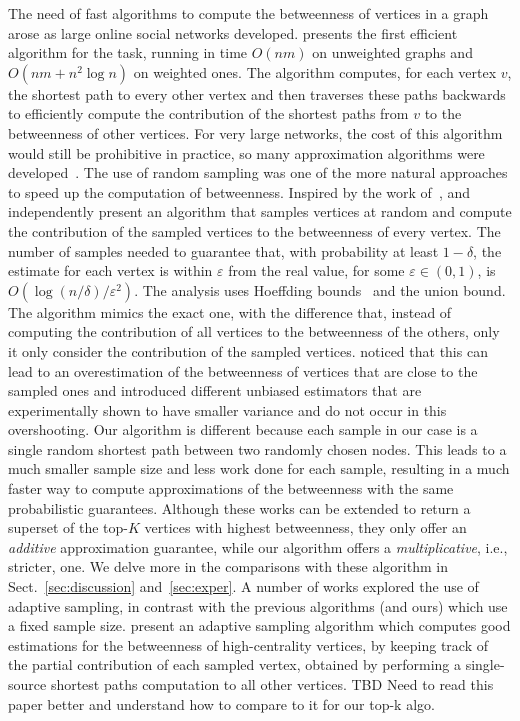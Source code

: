 The need of fast algorithms to compute the betweenness of vertices in a graph
arose as large online social networks developed. \citet{Brandes01} presents the
first efficient algorithm for the task, running in time $O(nm)$ on
unweighted graphs and $O(nm+n^2\log n)$ on weighted ones. The
algorithm computes, for each vertex $v$, the shortest path to every other vertex
and then traverses these paths backwards to efficiently compute the contribution
of the shortest paths from $v$ to the betweenness of other vertices. For very
large networks, the cost of this algorithm would still be prohibitive in
practice, so many approximation algorithms were
developed~\citep{JacobKLPT05,BrandesP07,BaderKMM07,GeisbergerSS08,MaiyaBW10,LimMRTB11}.
The use of random sampling was one of the more natural approaches to speed up
the computation of betweenness. Inspired by the work of~\citet{EppsteinW04},
\citet{JacobKLPT05} and independently \citet{BrandesP07} present an algorithm
that samples vertices at random and compute the contribution of the sampled
vertices to the betweenness of every vertex. The number of samples needed to
guarantee that, with probability at least $1-\delta$, the estimate for each
vertex is within $\varepsilon$ from the real value, for some
$\varepsilon\in(0,1)$, is $O(\log(n/\delta)/\varepsilon^2)$. The analysis uses
Hoeffding bounds~\citep{Hoeffding63} and the union bound. The algorithm mimics
the exact one, with the difference that, instead of computing the contribution
of all vertices to the betweenness of the others, only it only consider the
contribution of the sampled vertices. \citet{GeisbergerSS08} noticed that this
can lead to an overestimation of the betweenness of vertices that are close to
the sampled ones and introduced different unbiased estimators that are
experimentally shown to have smaller variance and do not occur in this
overshooting. Our algorithm is different because each sample in our case is a
single random shortest path between two randomly chosen nodes. This leads to a
much smaller sample size and less work done for each sample, resulting in a much
faster way to compute approximations of the betweenness with the same
probabilistic guarantees. Although these works can be extended to return a
superset of the top-$K$ vertices with highest betweenness, they only offer an
\emph{additive}  approximation guarantee, while our algorithm offers a
\emph{multiplicative}, i.e., stricter, one. We delve more in the comparisons
with these algorithm in Sect.~\ref{sec:discussion} and~\ref{sec:exper}. A number of works explored
the use of adaptive sampling, in contrast with the previous algorithms (and
ours) which use a fixed sample size. \citet{BaderKMM07} present an adaptive
sampling algorithm which computes good estimations for the betweenness of
high-centrality vertices, by keeping track of the partial contribution of each
sampled vertex, obtained by performing a single-source shortest paths
computation to all other vertices. \XXX TBD Need to read this paper better and
understand how to compare to it for our top-k algo.

